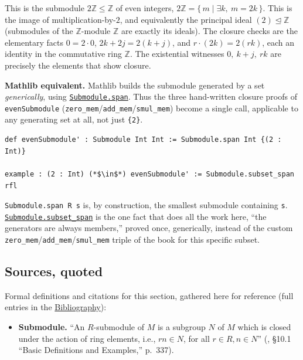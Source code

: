 \begin{mathreading}

This is the submodule \(2\mathbb{Z} \le \mathbb{Z}\) of even integers, \(2\mathbb{Z} = \{\, m \mid \exists k,\ m = 2k \,\}\). This is the image of multiplication-by-\(2\), and equivalently the principal ideal \((2)\trianglelefteq \mathbb{Z}\) (submodules of the \(\mathbb{Z}\)-module \(\mathbb{Z}\) are exactly its ideals). The closure checks are the elementary facts \(0 = 2\cdot 0\), \(2k + 2j = 2(k+j)\), and \(r\cdot(2k) = 2(rk)\), each an identity in the commutative ring \(\mathbb{Z}\). The existential witnesses \(0,\ k+j,\ rk\) are precisely the elements that show closure.

\end{mathreading}

\textbf{Mathlib equivalent.} Mathlib builds the submodule generated by a set \emph{generically}, using \href{https://loogle.lean-lang.org/?q=Submodule.span}{\texttt{Submodule.span}}. Thus the three hand-written closure proofs of \texttt{evenSubmodule} (\texttt{zero\_\allowbreak{}mem}/\texttt{add\_\allowbreak{}mem}/\texttt{smul\_\allowbreak{}mem}) become a single call, applicable to any generating set at all, not just \texttt{\{2\}}.

\begin{lstlisting}
def evenSubmodule' : Submodule Int Int := Submodule.span Int {(2 : Int)}

example : (2 : Int) (*$\in$*) evenSubmodule' := Submodule.subset_span rfl
\end{lstlisting}

\texttt{Submodule.span R s} is, by construction, the smallest submodule containing \texttt{s}. \href{https://loogle.lean-lang.org/?q=Submodule.subset_span}{\texttt{Submodule.subset\_\allowbreak{}span}} is the one fact that does all the work here, ``the generators are always members,'' proved once, generically, instead of the custom \texttt{zero\_\allowbreak{}mem}/\texttt{add\_\allowbreak{}mem}/\texttt{smul\_\allowbreak{}mem} triple of the book for this specific subset.

\subsection{Sources, quoted}\label{sec:11-modules:04-submodules:3}

Formal definitions and citations for this section, gathered here for reference (full entries in the \hyperref[sec:root:bibliography:1]{Bibliography}):

\begin{itemize}
\tightlist
\item
  \textbf{Submodule.} ``An \(R\)-submodule of \(M\) is a subgroup \(N\) of \(M\) which is closed under the action of ring elements, i.e., \(rn \in N\), for all \(r \in R, n \in N\)'' (\cite{DummitFoote2003}, §10.1 ``Basic Definitions and Examples,'' p.~337).
\end{itemize}
